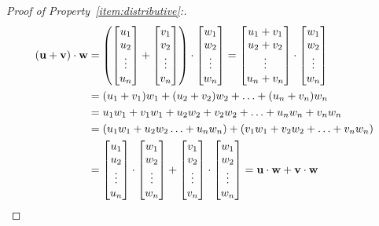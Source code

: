 \documentclass{ximera}
\begin{document}
\begin{proof}[Proof of Property~\ref{item:distributive}:]

\begin{align*}
\left(\mathbf{u}+\mathbf{v}\right)\cdot \mathbf{w}&=\left(\begin{bmatrix} u_1\\ u_2\\ \vdots\\ u_n \end{bmatrix}+\begin{bmatrix} v_1\\ v_2\\ \vdots\\ v_n \end{bmatrix}\right)\cdot \begin{bmatrix}w_1\\w_2\\\vdots\\w_n\end{bmatrix}=\begin{bmatrix}
u_1+v_1\\
u_2+v_2\\
\vdots\\
u_n+v_n
\end{bmatrix}\cdot \begin{bmatrix}w_1\\w_2\\\vdots\\w_n\end{bmatrix}\\
&=(u_1+v_1)w_1+
(u_2+v_2)w_2+
\ldots+
(u_n+v_n)w_n\\
&=u_1w_1+v_1w_1+
u_2w_2+v_2w_2+
\ldots+
u_nw_n+v_nw_n\\
&=(u_1w_1+
u_2w_2\ldots+u_nw_n)+(v_1w_1+v_2w_2+
\ldots
+v_nw_n)\\
&=\begin{bmatrix}
u_1\\
u_2\\
\vdots\\
u_n
\end{bmatrix}\cdot\begin{bmatrix}w_1\\w_2\\\vdots\\w_n\end{bmatrix}+\begin{bmatrix}
v_1\\
v_2\\
\vdots\\
v_n
\end{bmatrix}\cdot \begin{bmatrix}w_1\\w_2\\\vdots\\w_n\end{bmatrix}
=\mathbf{u}\cdot\mathbf{w}+\mathbf{v}\cdot\mathbf{w}
\end{align*}
\end{proof}
\end{document}
